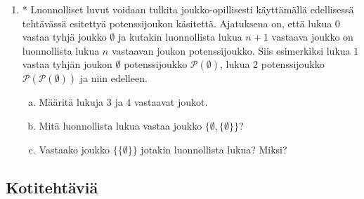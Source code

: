 \begin{enumerate}
\item * %
Luonnolliset luvut voidaan tulkita joukko-opillisesti käyttämällä edellisessä tehtävässä esitettyä potenssijoukon käsitettä. Ajatuksena on, että lukua $0$ vastaa tyhjä joukko $\emptyset$ ja kutakin luonnollista lukua $n + 1$ vastaava joukko on luonnollista lukua $n$ vastaavan joukon potenssijoukko. Siis esimerkiksi lukua $1$ vastaa tyhjän joukon $\emptyset$ potenssijoukko $\mathcal{P}(\emptyset)$, lukua $2$ potenssijoukko $\mathcal{P}(\mathcal{P}(\emptyset))$ ja niin edelleen.
\begin{enumerate}[a)]
\item Määritä lukuja $3$ ja $4$ vastaavat joukot.
\item Mitä luonnollista lukua vastaa joukko $\{\emptyset,\{\emptyset\}\}$?
\item Vastaako joukko $\{\{\emptyset\}\}$ jotakin luonnollista lukua? Miksi?
\end{enumerate}

\end{enumerate}

\subsection*{Kotitehtäviä}

